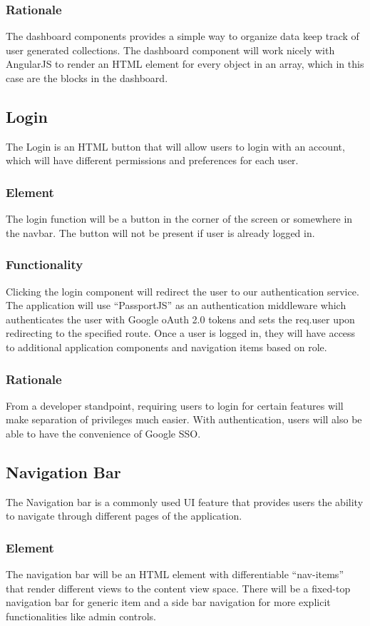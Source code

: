 \documentclass[journal,10pt,onecolumn,compsoc]{IEEEtran}
\begin{document}
    \subsubsection{Rationale} 
    The dashboard components provides a simple way to organize data keep track of user generated collections. The dashboard component will work nicely with AngularJS to render an HTML element for every object in an array, which in this case are the blocks in the dashboard.
	\subsection{Login}
	The Login is an HTML button that will allow users to login with an account, which will have different permissions and preferences for each user.
	\subsubsection{Element}
	The login function will be a button in the corner of the screen or somewhere in the navbar. The button will not be present if user is already logged in.
	\subsubsection{Functionality}
    Clicking the login component will redirect the user to our authentication service. The application will use ``PassportJS'' as an authentication middleware which authenticates the user with Google oAuth 2.0 tokens and sets the req.user upon redirecting to the specified route. Once a user is logged in, they will have access to additional application components and navigation items based on role.
	\subsubsection{Rationale}
	From a developer standpoint, requiring users to login for certain features will make separation of privileges much easier. With authentication, users will also be able to have the convenience of Google SSO.
	
	\subsection{Navigation Bar}
	The Navigation bar is a commonly used UI feature that provides users the ability to navigate through different pages of the application.
    \subsubsection{Element}
    The navigation bar will be an HTML element with differentiable ``nav-items'' that render different views to the content view space. There will be a fixed-top navigation bar for generic item and a side bar navigation for more explicit functionalities like admin controls. 
\end{document}
